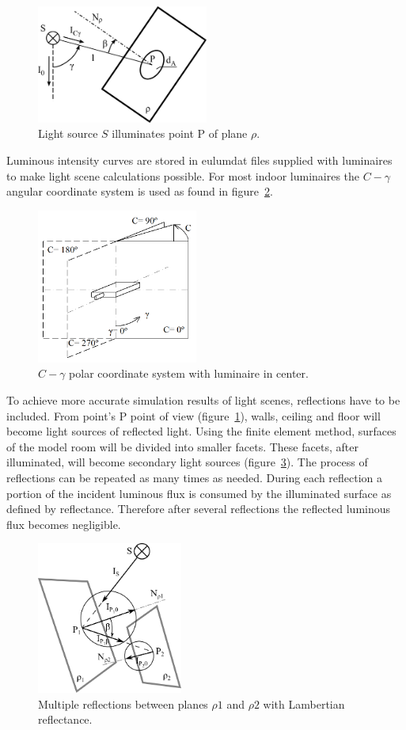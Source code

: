 \begin{figure}[htb]
  \centering
  \includegraphics[width=160pt]{315_osvetlenost_bodovym_zdrojem_2}
  \caption{Light source $S$ illuminates point P of plane $\rho$.}
  \label{fig:osv}
\end{figure}

Luminous intensity curves are stored in eulumdat files supplied with luminaires to make light scene calculations possible. For most indoor luminaires the $C-\gamma$ angular coordinate system is used as found in figure~\ref{fig:cgamma}.

\begin{figure}[htb]
  \centering
  \includegraphics[width=150pt]{Cgama}
  \caption{$C-\gamma$ polar coordinate system with luminaire in center.}
  \label{fig:cgamma}
\end{figure}

To achieve more accurate simulation results of light scenes, reflections have to be included. From point's P point of view (figure~\ref{fig:osv}), walls, ceiling and floor will become light sources of reflected light. Using the finite element method, surfaces of the model room will be divided into smaller facets. These facets, after illuminated, will become secondary light sources (figure~\ref{fig:difRefl}). The process of reflections can be repeated as many times as needed. During each reflection a portion of the incident luminous flux is consumed by the illuminated surface as defined by reflectance. Therefore after several reflections the reflected luminous flux becomes negligible.

\begin{figure}[htb]
  \centering
  \includegraphics[width=136pt]{diffuseReflection}
  \caption{Multiple reflections between planes $\rho1$ and $\rho2$ with Lambertian reflectance.}
  \label{fig:difRefl}
\end{figure}


